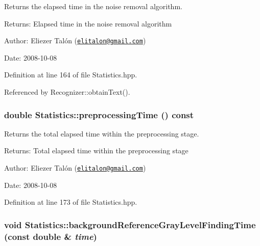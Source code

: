 Returns the elapsed time in the noise removal algorithm. 

\begin{Desc}
\item[Returns:]Elapsed time in the noise removal algorithm\end{Desc}
\begin{Desc}
\item[Author:]Eliezer Talón (\href{mailto:elitalon@gmail.com}{\tt elitalon@gmail.com}) \end{Desc}
\begin{Desc}
\item[Date:]2008-10-08 \end{Desc}


Definition at line 164 of file Statistics.hpp.

Referenced by Recognizer::obtainText().\hypertarget{class_statistics_d88deb57349fedd7035ccffa06b4859b}{
\subsubsection[preprocessingTime]{\setlength{\rightskip}{0pt plus 5cm}double Statistics::preprocessingTime () const}}
\label{class_statistics_d88deb57349fedd7035ccffa06b4859b}


Returns the total elapsed time within the preprocessing stage. 

\begin{Desc}
\item[Returns:]Total elapsed time within the preprocessing stage\end{Desc}
\begin{Desc}
\item[Author:]Eliezer Talón (\href{mailto:elitalon@gmail.com}{\tt elitalon@gmail.com}) \end{Desc}
\begin{Desc}
\item[Date:]2008-10-08 \end{Desc}


Definition at line 173 of file Statistics.hpp.\hypertarget{class_statistics_f8a60e8a89be8fe8b2c46782681c1a2c}{
\subsubsection[backgroundReferenceGrayLevelFindingTime]{\setlength{\rightskip}{0pt plus 5cm}void Statistics::backgroundReferenceGrayLevelFindingTime (const double \& {\em time})}}
\label{class_statistics_f8a60e8a89be8fe8b2c46782681c1a2c}


